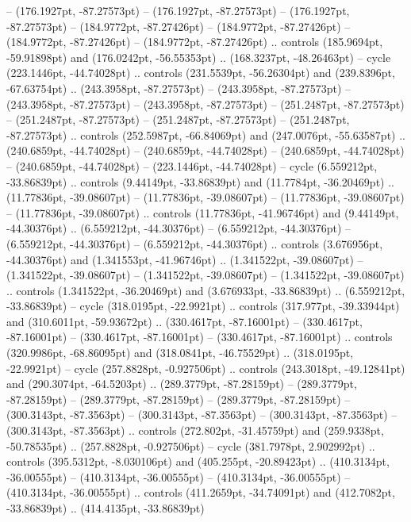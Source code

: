  -- (176.1927pt, -87.27573pt)
 -- (176.1927pt, -87.27573pt)
 -- (176.1927pt, -87.27573pt)
 -- (184.9772pt, -87.27426pt)
 -- (184.9772pt, -87.27426pt)
 -- (184.9772pt, -87.27426pt)
 -- (184.9772pt, -87.27426pt) .. controls (185.9694pt, -59.91898pt) and (176.0242pt, -56.55353pt) .. (168.3237pt, -48.26463pt) -- cycle
(223.1446pt, -44.74028pt) .. controls (231.5539pt, -56.26304pt) and (239.8396pt, -67.63754pt) .. (243.3958pt, -87.27573pt)
 -- (243.3958pt, -87.27573pt)
 -- (243.3958pt, -87.27573pt)
 -- (243.3958pt, -87.27573pt)
 -- (251.2487pt, -87.27573pt)
 -- (251.2487pt, -87.27573pt)
 -- (251.2487pt, -87.27573pt)
 -- (251.2487pt, -87.27573pt) .. controls (252.5987pt, -66.84069pt) and (247.0076pt, -55.63587pt) .. (240.6859pt, -44.74028pt)
 -- (240.6859pt, -44.74028pt)
 -- (240.6859pt, -44.74028pt)
 -- (240.6859pt, -44.74028pt)
 -- (223.1446pt, -44.74028pt) -- cycle
(6.559212pt, -33.86839pt) .. controls (9.44149pt, -33.86839pt) and (11.7784pt, -36.20469pt) .. (11.77836pt, -39.08607pt)
 -- (11.77836pt, -39.08607pt)
 -- (11.77836pt, -39.08607pt)
 -- (11.77836pt, -39.08607pt) .. controls (11.77836pt, -41.96746pt) and (9.44149pt, -44.30376pt) .. (6.559212pt, -44.30376pt)
 -- (6.559212pt, -44.30376pt)
 -- (6.559212pt, -44.30376pt)
 -- (6.559212pt, -44.30376pt) .. controls (3.676956pt, -44.30376pt) and (1.341553pt, -41.96746pt) .. (1.341522pt, -39.08607pt)
 -- (1.341522pt, -39.08607pt)
 -- (1.341522pt, -39.08607pt)
 -- (1.341522pt, -39.08607pt) .. controls (1.341522pt, -36.20469pt) and (3.676933pt, -33.86839pt) .. (6.559212pt, -33.86839pt) -- cycle
(318.0195pt, -22.9921pt) .. controls (317.977pt, -39.33944pt) and (310.6011pt, -59.93672pt) .. (330.4617pt, -87.16001pt)
 -- (330.4617pt, -87.16001pt)
 -- (330.4617pt, -87.16001pt)
 -- (330.4617pt, -87.16001pt) .. controls (320.9986pt, -68.86095pt) and (318.0841pt, -46.75529pt) .. (318.0195pt, -22.9921pt) -- cycle
(257.8828pt, -0.927506pt) .. controls (243.3018pt, -49.12841pt) and (290.3074pt, -64.5203pt) .. (289.3779pt, -87.28159pt)
 -- (289.3779pt, -87.28159pt)
 -- (289.3779pt, -87.28159pt)
 -- (289.3779pt, -87.28159pt)
 -- (300.3143pt, -87.3563pt)
 -- (300.3143pt, -87.3563pt)
 -- (300.3143pt, -87.3563pt)
 -- (300.3143pt, -87.3563pt) .. controls (272.802pt, -31.45759pt) and (259.9338pt, -50.78535pt) .. (257.8828pt, -0.927506pt) -- cycle
(381.7978pt, 2.902992pt) .. controls (395.5312pt, -8.030106pt) and (405.255pt, -20.89423pt) .. (410.3134pt, -36.00555pt)
 -- (410.3134pt, -36.00555pt)
 -- (410.3134pt, -36.00555pt)
 -- (410.3134pt, -36.00555pt) .. controls (411.2659pt, -34.74091pt) and (412.7082pt, -33.86839pt) .. (414.4135pt, -33.86839pt)
